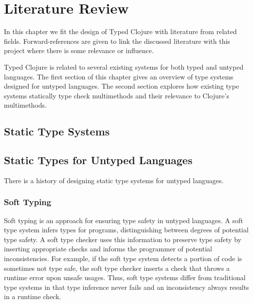 
\chapter{Literature Review}

In this chapter we fit the design of Typed Clojure with literature from related fields.
Forward-references are given to link the discussed literature with this project
where there is some relevance or influence.

Typed Clojure is related to several existing systems for both typed and untyped languages.
The first section of this chapter gives an overview of type systems designed for untyped languages.
The second section explores how existing type systems statically type check multimethods
and their relevance to Clojure's multimethods.

\section{Static Type Systems}


\section{Static Types for Untyped Languages}

There is a history of designing static type systems for untyped languages. 

\subsection{Soft Typing}

Soft typing\cite{CF91}
is an approach for ensuring type safety in untyped languages.
A soft type system infers types for programs, distinguishing between degrees
of potential type safety.
A soft type checker uses this information to 
preserve type safety by inserting appropriate checks 
and informs the programmer of potential inconsistencies.
For example, if the soft type system detects a portion of code is sometimes not type safe,
the soft type checker inserts a check that throws a runtime error upon unsafe usages.
Thus, soft type systems differ from traditional type systems in that type inference 
never fails and an inconsistency always results in a runtime check.

